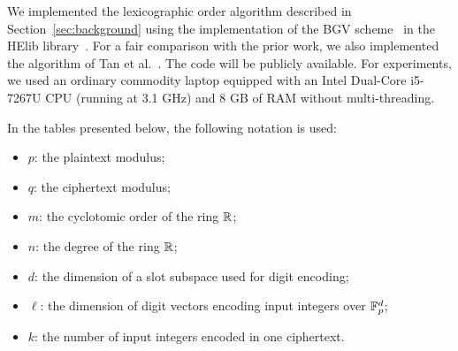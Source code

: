 We implemented the lexicographic order algorithm described in Section~\ref{sec:background} using the implementation of the BGV scheme~\cite{BGV12} in the HElib library~\cite{HElib}.
For a fair comparison with the prior work, we also implemented the algorithm of Tan et al.~\cite{TLWRK20}.
The code will be publicly available.
For experiments, we used an ordinary commodity laptop equipped with an Intel Dual-Core i5-7267U CPU (running at 3.1 GHz) and 8 GB of RAM without multi-threading.

In the tables presented below, the following notation is used:
\begin{itemize}
  \item $p$: the plaintext modulus;
  \item $q$: the ciphertext modulus;
  \item $m$: the cyclotomic order of the ring $\mathbb{R}$;
  \item $n$: the degree of the ring $\mathbb{R}$;
  \item $d$: the dimension of a slot subspace used for digit encoding;
  \item $\ell$: the dimension of digit vectors encoding input integers over $\mathbb{F}_p^d$;
  \item $k$: the number of input integers encoded in one ciphertext.
\end{itemize}

